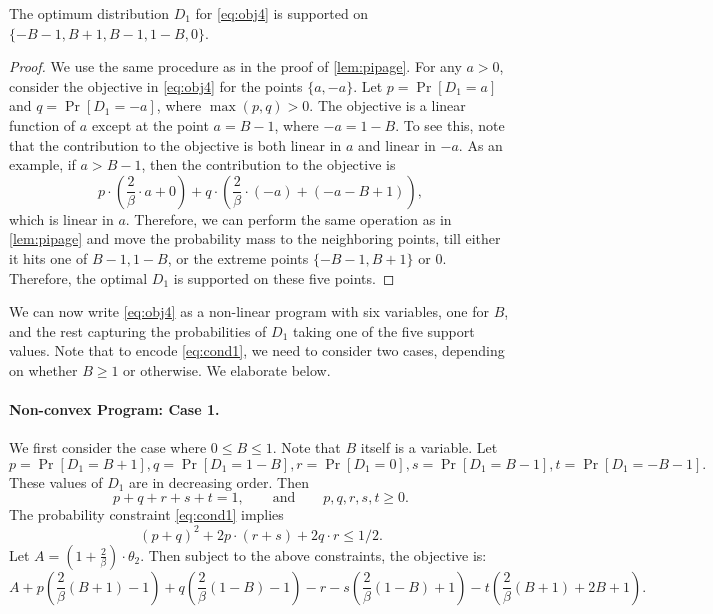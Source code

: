 \begin{lemma}
    The optimum distribution $D_1$ for \cref{eq:obj4} is supported on $\{-B-1, B+1, B-1, 1-B, 0\}$. 
\end{lemma}
\begin{proof}
    We use the same procedure as in the proof of \cref{lem:pipage}. For any $a > 0$, consider the objective in \cref{eq:obj4} for the points $\{a,-a\}$. Let $p = \Pr[D_1 = a]$ and $q = \Pr[D_1 = -a]$, where $\max(p,q) > 0$. The objective is a linear function of $a$ except at the point $a = B-1$, where $-a = 1-B$. To see this, note that the contribution to the objective is both linear in $a$ and linear in $-a$. As an example, if $a >  B-1$, then the contribution to the objective is 
    $$p \cdot \left( \frac{2}{\beta} \cdot a + 0 \right) + q \cdot \left( \frac{2}{\beta} \cdot (-a) +   (-a-B+1) \right), $$
    which is linear in $a$. Therefore, we can perform the same operation as in \cref{lem:pipage} and move the probability mass to the neighboring points, till either it hits one of $B-1, 1-B$, or the extreme points $\{-B-1, B+1\}$ or $0$. Therefore, the optimal $D_1$ is supported on these five points.
\end{proof}

We can now write \cref{eq:obj4} as a non-linear program with six variables, one for $B$, and the rest capturing the probabilities of $D_1$ taking one of the five support values.  Note that to encode \cref{eq:cond1}, we need to consider two cases, depending on whether $B \ge 1$ or otherwise. We elaborate below.

\paragraph{Non-convex Program: Case 1.} We first consider the case where  $0 \le B \le 1.$ Note that $B$ itself is a variable. Let 
$$p = \Pr[D_1 = B+1], q = \Pr[D_1= 1-B], r = \Pr[ D_1 = 0], s = \Pr[D_1 = B-1], t = \Pr[D_1 = -B-1].$$ 
These values of $D_1$ are in decreasing order. Then
\begin{equation} 
\label{eq:sum1}
p + q + r + s + t = 1, \qquad \mbox{and} \qquad p,q,r,s,t \ge 0.
\end{equation}
The probability constraint \cref{eq:cond1} implies
\begin{equation} 
\label{eq:prob1} (p + q)^2 + 2 p \cdot (r + s) + 2  q \cdot r \le 1/2.
\end{equation}
Let $A = \left(1 + \frac{2}{\beta}\right) \cdot \theta_2$. Then subject to the above constraints, the objective is:
$$ A +  p \left(\frac{2}{\beta}(B+1) - 1\right) + q \left(\frac{2}{\beta}(1-B) - 1\right) - r - s\left( \frac{2}{\beta} (1-B)+1\right) - t \left( \frac{2}{\beta}(B+1) + 2B + 1 \right). $$

